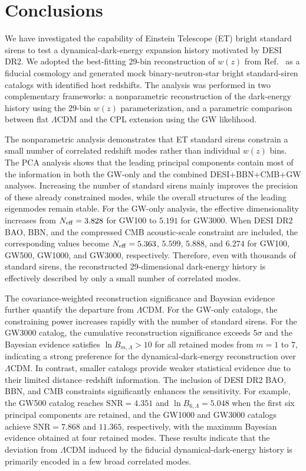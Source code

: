 \documentclass[
  aps,
  prd,
  twocolumn,
  nofootinbib,
  superscriptaddress,
  floatfix,
  longbibliography
]{revtex4-2}
\newcommand{\LCDM}{\ensuremath{\Lambda\mathrm{CDM}}}
\begin{document}
\section{Conclusions}
\label{sec:conclusions}

We have investigated the capability of Einstein Telescope (ET) bright
standard sirens to test a dynamical-dark-energy expansion history motivated
by DESI DR2. We adopted the best-fitting 29-bin reconstruction of $w(z)$
from Ref.~\cite{Gu_2025} as a fiducial cosmology and generated mock
binary-neutron-star bright standard-siren catalogs with identified host
redshifts. The analysis was performed in two complementary frameworks:
a nonparametric reconstruction of the dark-energy history using the
29-bin $w(z)$ parameterization, and a parametric comparison between flat
$\LCDM$ and the CPL extension using the GW likelihood.

The nonparametric analysis demonstrates that ET standard sirens constrain
a small number of correlated redshift modes rather than individual
$w(z)$ bins. The PCA analysis shows that the leading principal components
contain most of the information in both the GW-only and the combined DESI+BBN+CMB+GW analyses. Increasing the number of standard sirens mainly
improves the precision of these already constrained modes, while the
overall structures of the leading eigenmodes remain stable. For the
GW-only analysis, the effective dimensionality increases from
$N_{\rm eff}=3.828$ for GW100 to $5.191$ for GW3000. When DESI DR2 BAO,
BBN, and the compressed CMB acoustic-scale constraint are included, the
corresponding values become
$N_{\rm eff}=5.363$, $5.599$, $5.888$, and $6.274$ for GW100, GW500,
GW1000, and GW3000, respectively. Therefore, even with thousands of
standard sirens, the reconstructed 29-dimensional dark-energy history is
effectively described by only a small number of correlated modes.

The covariance-weighted reconstruction significance and Bayesian evidence
further quantify the departure from $\LCDM$. For the GW-only catalogs, the constraining power increases rapidly with
the number of standard sirens. For the GW3000 catalog, the cumulative
reconstruction significance exceeds $5\sigma$ and the Bayesian evidence
satisfies $\ln B_{m,\Lambda}>10$ for all retained modes from $m=1$ to $7$,
indicating a strong preference for the dynamical-dark-energy reconstruction
over $\LCDM$. In contrast, smaller catalogs provide weaker statistical
evidence due to their limited distance--redshift information. The inclusion of DESI DR2 BAO, BBN,
and CMB constraints significantly enhances the sensitivity. For example,
the GW500 catalog reaches
$\mathrm{SNR}=4.351$ and $\ln B_{6,\Lambda}=5.048$ when the first six
principal components are retained, and the GW1000 and GW3000 catalogs
achieve $\mathrm{SNR}=7.868$ and $11.365$, respectively, with the maximum
Bayesian evidence obtained at four retained modes. These results indicate
that the deviation from $\LCDM$ induced by the fiducial dynamical-dark-energy
history is primarily encoded in a few broad correlated modes.
\end{document}
